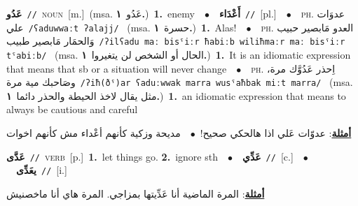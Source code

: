 \documentclass[10pt,a4paper,twoside]{article} %
\begin{document}
\begin{multicols}{2}
{\setlength\topsep{0pt}\textbf{\foreignlanguage{arabic}{عَدُو}}\ {\color{gray}\texttt{//}\color{black}}\ \textsc{noun}\ [m.]\ \color{gray}(msa. \foreignlanguage{arabic}{عَدُو}~\foreignlanguage{arabic}{\textbf{١.}})\color{black}\ \textbf{1.}~enemy\ \ $\bullet$\ \ \setlength\topsep{0pt}\textbf{\foreignlanguage{arabic}{أَعْدَاء}}\ {\color{gray}\texttt{//}\color{black}}\ [pl.]\ \ $\bullet$\ \ \textsc{ph.} \color{gray} \foreignlanguage{arabic}{عدوَات علي}\color{black}\ {\color{gray}\texttt{/{\sffamily ʕaduwwaːt ʔalajj}/}\color{black}}\ \color{gray} (msa. \foreignlanguage{arabic}{حسرة}~\foreignlanguage{arabic}{\textbf{١.}})\color{black}\ \textbf{1.}~Alas!\ \ $\bullet$\ \ \textsc{ph.} \color{gray} \foreignlanguage{arabic}{العدو مَابصير حبيب وَالحمَار مَابصير طبيب}\color{black}\ {\color{gray}\texttt{/{\sffamily ʔilʕadu maː bisˤiːr ħabiːb wiliħmaːr maː bisˤiːr tˤabiːb}/}\color{black}}\ \color{gray} (msa. \foreignlanguage{arabic}{الحال أو الشخص لن يتغيروا}~\foreignlanguage{arabic}{\textbf{١.}})\color{black}\ \textbf{1.}~It is an idiomatic expression that means that sb or a situation will never change\ \ $\bullet$\ \ \textsc{ph.} \color{gray} \foreignlanguage{arabic}{اِحذر عَدُوَّك مرة، وصَاحبك مية مرة}\color{black}\ {\color{gray}\texttt{/{\sffamily ʔiħ(ðˤ)ar ʕaduːwwak marra wusˤaħbak miːt marra}/}\color{black}}\ \color{gray} (msa. \foreignlanguage{arabic}{مثل يقال لاخذ الحيطة والحذر دائما}~\foreignlanguage{arabic}{\textbf{١.}})\color{black}\ \textbf{1.}~an idiomatic expression that means to always be cautious and careful\  \begin{flushright}\color{gray}\foreignlanguage{arabic}{\textbf{\underline{\foreignlanguage{arabic}{أمثلة}}}: عدوّات عَلي اذا هالحكي صحيح!\ $\bullet$\ \  مديحة وزكية كأنهم أعْداء مش كأنهم اخوات}\end{flushright}\color{black}} \vspace{2mm}

{\setlength\topsep{0pt}\textbf{\foreignlanguage{arabic}{عَدَّى}}\ {\color{gray}\texttt{//}\color{black}}\ \textsc{verb}\ [p.]\ \textbf{1.}~let things go.  \textbf{2.}~ignore sth\ \ $\bullet$\ \ \setlength\topsep{0pt}\textbf{\foreignlanguage{arabic}{عَدِّي}}\ {\color{gray}\texttt{//}\color{black}}\ [c.]\ \ $\bullet$\ \ \setlength\topsep{0pt}\textbf{\foreignlanguage{arabic}{يعَدِّى}}\ {\color{gray}\texttt{//}\color{black}}\ [i.]\  \begin{flushright}\color{gray}\foreignlanguage{arabic}{\textbf{\underline{\foreignlanguage{arabic}{أمثلة}}}: المرة الماضية أنا عَدِّيتها بمزاجي. المرة هاي أنا ماخصنيش}\end{flushright}\color{black}} \vspace{2mm}


\end{multicols}
\end{document}
